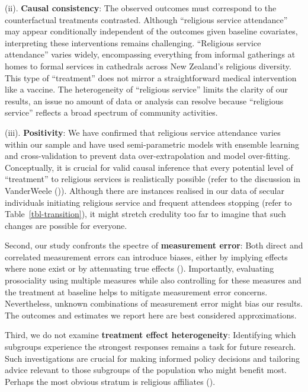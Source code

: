 \documentclass[
  single column]{article}
\begin{document}
(ii). \textbf{Causal consistency}: The observed outcomes must correspond
to the counterfactual treatments contrasted. Although ``religious
service attendance'' may appear conditionally independent of the
outcomes given baseline covariates, interpreting these interventions
remains challenging. ``Religious service attendance'' varies widely,
encompassing everything from informal gatherings at homes to formal
services in cathedrals across New Zealand's religious diversity. This
type of ``treatment'' does not mirror a straightforward medical
intervention like a vaccine. The heterogeneity of ``religious service''
limits the clarity of our results, an issue no amount of data or
analysis can resolve because ``religious service'' reflects a broad
spectrum of community activities.

(iii). \textbf{Positivity}: We have confirmed that religious service
attendance varies within our sample and have used semi-parametric models
with ensemble learning and cross-validation to prevent data
over-extrapolation and model over-fitting. Conceptually, it is crucial
for valid causal inference that every potential level of ``treatment''
to religious services is realistically possible (refer to the discussion
in VanderWeele
()). Although
there are instances realised in our data of secular individuals
initiating religious service and frequent attendees stopping (refer to
Table~\ref{tbl-transition}), it might stretch credulity too far to
imagine that such changes are possible for everyone.

Second, our study confronts the spectre of \textbf{measurement error}:
Both direct and correlated measurement errors can introduce biases,
either by implying effects where none exist or by attenuating true
effects (). Importantly, evaluating prosociality using multiple
measures while also controlling for these measures and the treatment at
baseline helps to mitigate measurement error concerns. Nevertheless,
unknown combinations of measurement error might bias our results. The
outcomes and estimates we report here are best considered
approximations.

Third, we do not examine \textbf{treatment effect heterogeneity}:
Identifying which subgroups experience the strongest responses remains a
task for future research. Such investigations are crucial for making
informed policy decisions and tailoring advice relevant to those
subgroups of the population who might benefit most. Perhaps the most
obvious stratum is religious affiliates
().
\end{document}
